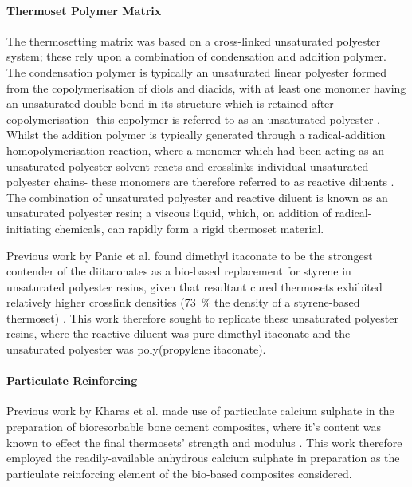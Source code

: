 \paragraph{Thermoset Polymer Matrix}
The thermosetting matrix was based on a cross-linked unsaturated polyester
 system; these rely upon a combination of condensation and addition polymer.
The condensation polymer is typically an unsaturated linear polyester
 formed from the copolymerisation of diols and diacids, with at least one
 monomer having an unsaturated double bond in its structure which is
 retained after copolymerisation- this copolymer is referred to as an
 unsaturated polyester \cite{Seraji2022}.
Whilst the addition polymer is typically generated through a radical-addition
 homopolymerisation reaction, where a monomer which had been acting as
 an unsaturated polyester solvent reacts and crosslinks individual 
 unsaturated polyester chains- these monomers are therefore referred to as
 reactive diluents \cite{Chen2015}.
The combination of unsaturated polyester and reactive diluent is known
 as an unsaturated polyester resin; a viscous liquid, which, on addition
 of radical-initiating chemicals, can rapidly form a rigid thermoset
 material.

Previous work by Panic et al. found dimethyl itaconate to be the strongest
 contender of the diitaconates as a bio-based replacement for styrene
 in unsaturated polyester resins, given that resultant cured thermosets
 exhibited relatively higher crosslink densities (73~\unit{\percent} the
 density of a styrene-based thermoset) \cite{Panic2017}.
This work therefore sought to replicate these unsaturated polyester resins,
 where the reactive diluent was pure dimethyl itaconate and the unsaturated
 polyester was poly(propylene itaconate).

\paragraph{Particulate Reinforcing}
Previous work by Kharas et al. made use of particulate calcium sulphate
 in the preparation of bioresorbable bone cement composites, where it's 
 content was known to effect the final thermosets' strength and modulus
 \cite{Kharas1997}.
This work therefore employed the readily-available anhydrous
 calcium sulphate in preparation as the particulate reinforcing element
 of the bio-based composites considered.

